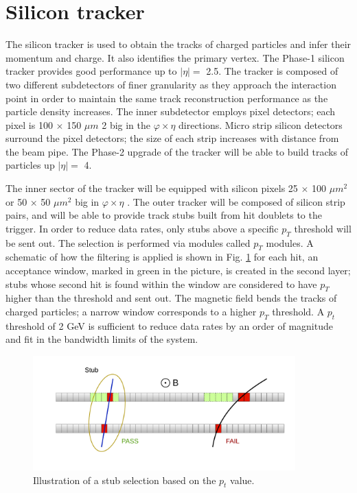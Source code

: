\documentclass[../../main.tex]{subfiles}
\begin{document}
\section{Silicon tracker}
\label{sec:Si-track}
The silicon tracker \cite{Si-track} is used to obtain the tracks of charged particles and infer their momentum and charge. It also identifies the primary vertex. The Phase-1 silicon tracker provides good performance up to $|\eta| =$ 2.5. The tracker is composed of two different subdetectors of finer granularity as they approach the interaction point in order to maintain the same track reconstruction performance as the particle density increases. The inner subdetector employs pixel detectors; each pixel is 100 $\times$ 150 $\mu m$ 2 big in the $\varphi \times \eta$ directions. Micro strip silicon detectors surround the pixel detectors; the size of each strip increases with distance from the beam pipe.  
The Phase-2 upgrade \cite{Si-track-up} of the tracker will be able to build tracks of particles up $| \eta| =$ 4.  

The inner sector of the tracker will be equipped with silicon pixels 25 $\times$ 100 $\mu m^2$  or 50 × 50 $\mu m^2$ big in $\varphi \times \eta$ . The outer tracker will be composed of silicon strip pairs, and will be able to provide track stubs built from hit doublets to the trigger. In order to reduce data rates, only stubs above a specific $p_T$ threshold will be sent out. The selection is performed via modules called $p_T$ modules.  
A schematic of how the filtering is applied is shown in Fig. \ref{fig:Si-stubs} for each hit, an acceptance window, marked in green in the picture, is created in the second layer; stubs whose second hit is found within the window are considered to have $p_T$ higher than the threshold and sent out. The magnetic field bends the tracks of charged particles; a narrow window corresponds to a higher $p_T$ threshold. A $p_t$ threshold of 2 GeV is sufficient to reduce data rates by an order of magnitude and fit in the bandwidth limits of the system.

\begin{figure}[h]
    \centering
    \includegraphics[width=0.9\textwidth]{sections/02/Images/STUB_sitrack.pdf}
    \caption{Illustration of a stub selection based on the $p_t$ value.}
    \label{fig:Si-stubs}
\end{figure}
\end{document}
